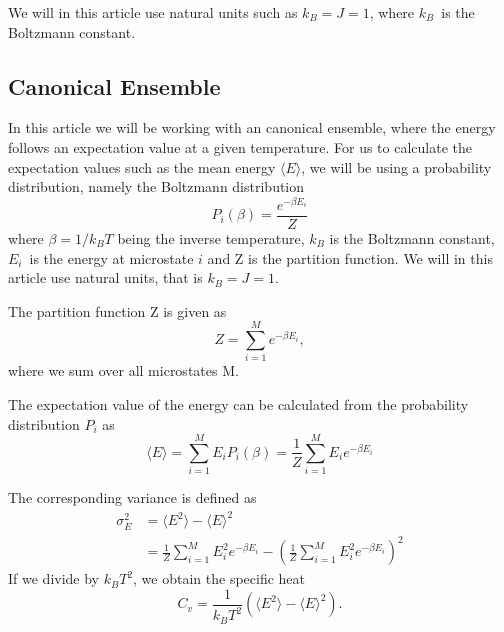 \documentclass[%
reprint,
nofootinbib,
amsmath,amssymb,
aps,
]{revtex4-1}
\begin{document}
We will in this article use natural units such as $k_B = J = 1$, where $k_B$ is the Boltzmann constant. 
\subsection{Canonical Ensemble} %
In this article we will be working with an canonical ensemble, where the energy follows an expectation value at a given temperature. For us to calculate the expectation values such as the mean energy $\langle E \rangle$, we will be using a probability distribution, namely the Boltzmann distribution
\begin{equation}\label{eq:boltz}
	P_i(\beta) = \frac{e^{-\beta E_i}}{Z}
\end{equation}
where $\beta = 1/k_BT$ being the inverse temperature, $k_B$ is the Boltzmann constant, $E_i$ is the energy at microstate $i$ and Z is the partition function. We will in this article use natural units, that is $k_B = J = 1$. 

The partition function Z is given as 
\begin{equation}\label{eq:Z}
	Z = \sum_{i=1}^{M}e^{-\beta E_i},
\end{equation} 
where we sum over all microstates M.

The expectation value of the energy can be calculated from the probability distribution $P_i$ as 
\begin{equation}\label{eq:E}
	\langle E\rangle = \sum_{i=1}^{M}E_iP_i(\beta) = \frac{1}{Z}\sum_{i=1}^ME_ie^{-\beta E_i}
\end{equation}

The corresponding variance is defined as 
\begin{equation}
	\begin{split}
\sigma_E^2 &= \langle E^2 \rangle -\langle E\rangle^2 \\
&= \frac{1}{Z}\sum_{i=1}^ME_i^2e^{-\beta E_i} - \left(\frac{1}{Z}\sum_{i=1}^ME_i^2e^{-\beta E_i}\right)^2
	\end{split}
\end{equation}
If we divide by $k_BT^2$, we obtain the specific heat 
\begin{equation}\label{eq:cv}
	C_v = \frac{1}{k_BT^2}\left(\langle E^2 \rangle -\langle E\rangle^2\right).
\end{equation}
\end{document}
